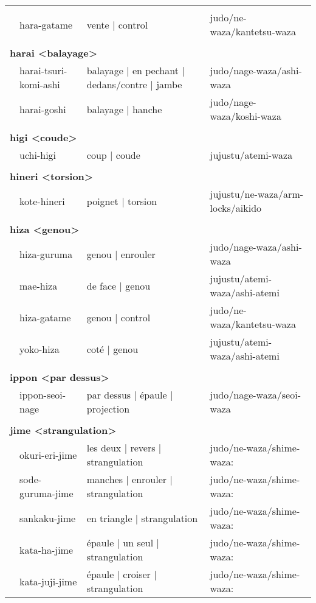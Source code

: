 \documentclass{article}%
\begin{document}
\begin{longtable}{rlll}
{}&\\%
&hara{-}gatame&vente | control&judo/ne{-}waza/kantetsu{-}waza\\%
&&&\\%
\multicolumn{3}{l}{\textbf{harai <balayage>}%
~%
}&\\%
&harai{-}tsuri{-}komi{-}ashi&balayage | en pechant | dedans/contre | jambe&judo/nage{-}waza/ashi{-}waza\\%
&harai{-}goshi&balayage | hanche&judo/nage{-}waza/koshi{-}waza\\%
&&&\\%
\multicolumn{3}{l}{\textbf{higi <coude>}%
~%
}&\\%
&uchi{-}higi&coup | coude&jujustu/atemi{-}waza\\%
&&&\\%
\multicolumn{3}{l}{\textbf{hineri <torsion>}%
~%
}&\\%
&kote{-}hineri&poignet | torsion&jujustu/ne{-}waza/arm{-}locks/aikido\\%
&&&\\%
\multicolumn{3}{l}{\textbf{hiza <genou>}%
~%
}&\\%
&hiza{-}guruma&genou | enrouler&judo/nage{-}waza/ashi{-}waza\\%
&mae{-}hiza&de face | genou&jujustu/atemi{-}waza/ashi{-}atemi\\%
&hiza{-}gatame&genou | control&judo/ne{-}waza/kantetsu{-}waza\\%
&yoko{-}hiza&coté | genou&jujustu/atemi{-}waza/ashi{-}atemi\\%
&&&\\%
\multicolumn{3}{l}{\textbf{ippon <par dessus>}%
~%
}&\\%
&ippon{-}seoi{-}nage&par dessus | épaule | projection&judo/nage{-}waza/seoi{-}waza\\%
&&&\\%
\multicolumn{3}{l}{\textbf{jime <strangulation>}%
~%
}&\\%
&okuri{-}eri{-}jime&les deux | revers | strangulation&judo/ne{-}waza/shime{-}waza:\\%
&sode{-}guruma{-}jime&manches | enrouler | strangulation&judo/ne{-}waza/shime{-}waza:\\%
&sankaku{-}jime&en triangle | strangulation&judo/ne{-}waza/shime{-}waza:\\%
&kata{-}ha{-}jime&épaule | un seul | strangulation&judo/ne{-}waza/shime{-}waza:\\%
&kata{-}juji{-}jime&épaule | croiser | strangulation&judo/ne{-}waza/shime{-}waza:\\%

\end{longtable}
\end{document}
